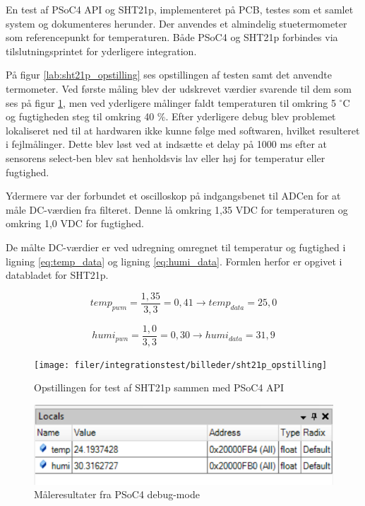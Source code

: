 
En test af PSoC4 API og SHT21p, implementeret på PCB, testes som et samlet system og dokumenteres herunder.
Der anvendes et almindelig stuetermometer som referencepunkt for temperaturen. Både PSoC4 og SHT21p forbindes via tilslutningsprintet for yderligere integration.

På figur \ref{lab:sht21p_opstilling} ses opstillingen af testen samt det anvendte termometer.
Ved første måling blev der udskrevet værdier svarende til dem som ses på figur \ref{lab:sht21p_test_resultat}, men ved yderligere målinger faldt temperaturen til omkring 5 ${^{\circ}}$C og fugtigheden steg til omkring 40 \%. 
Efter yderligere debug blev problemet lokaliseret ned til at hardwaren ikke kunne følge med softwaren, hvilket resulteret i fejlmålinger. Dette blev løst ved at indsætte et delay på 1000 ms efter at sensorens select-ben blev sat henholdsvis lav eller høj for temperatur eller fugtighed.

Ydermere var der forbundet et oscilloskop på indgangsbenet til ADCen for at måle DC-værdien fra filteret. Denne lå omkring 1,35 VDC for temperaturen og omkring 1,0 VDC for fugtighed.  


De målte DC-værdier er ved udregning omregnet til temperatur og fugtighed i ligning \ref{eq:temp_data} og ligning \ref{eq:humi_data}. Formlen herfor er opgivet i databladet for SHT21p.

\begin{equation}
temp_{pwm} = \frac{1,35}{3,3} = 0,41 
\rightarrow temp_{data} = 25,0
\label{eq:temp_data}
\end{equation}

\begin{equation}
humi_{pwn} = \frac{1,0}{3,3} = 0,30 
\rightarrow humi_{data} = 31,9
\label{eq:humi_data}
\end{equation}

\begin{figure}[htb]
  \begin{minipage}{0.48\textwidth}
    \centering
      \texttt{[image: filer/integrationstest/billeder/sht21p\_opstilling]}
      \caption{Opstillingen for test af SHT21p sammen med PSoC4 API}
    \label{lab:sht21p_opstilling}
  \end{minipage}
  \hspace{0.1\textwidth}
  \begin{minipage}{0.48\textwidth}
    \centering
      \includegraphics[width=\textwidth]{filer/integrationstest/billeder/sht21p_test_resultat}
      \caption{Måleresultater fra PSoC4 debug-mode}
    \label{lab:sht21p_test_resultat}
  \end{minipage}
\end{figure}


